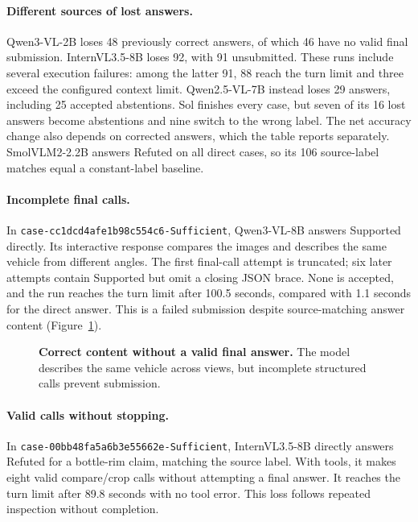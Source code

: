 

\paragraph{Different sources of lost answers.}
Qwen3-VL-2B loses 48 previously correct answers, of which 46 have no valid final submission.
InternVL3.5-8B loses 92, with 91 unsubmitted.
These runs include several execution failures: among the latter 91, 88 reach the turn limit and three exceed the configured context limit.
Qwen2.5-VL-7B instead loses 29 answers, including 25 accepted abstentions.
Sol finishes every case, but seven of its 16 lost answers become abstentions and nine switch to the wrong label.
The net accuracy change also depends on corrected answers, which the table reports separately.
SmolVLM2-2.2B answers Refuted on all direct cases, so its 106 source-label matches equal a constant-label baseline.

\paragraph{Incomplete final calls.}
In \texttt{case-cc1dcd4afe1b98c554c6-Sufficient}, Qwen3-VL-8B answers Supported directly.
Its interactive response compares the images and describes the same vehicle from different angles.
The first final-call attempt is truncated; six later attempts contain Supported but omit a closing JSON brace.
None is accepted, and the run reaches the turn limit after 100.5 seconds, compared with 1.1 seconds for the direct answer.
This is a failed submission despite source-matching answer content (Figure~\ref{fig:cases}).

\begin{figure}[t]\centering

\caption{\textbf{Correct content without a valid final answer.}
The model describes the same vehicle across views, but incomplete structured calls prevent submission.}
\label{fig:cases}
\end{figure}

\paragraph{Valid calls without stopping.}
In \texttt{case-00bb48fa5a6b3e55662e-Sufficient}, InternVL3.5-8B directly answers Refuted for a bottle-rim claim, matching the source label.
With tools, it makes eight valid compare/crop calls without attempting a final answer.
It reaches the turn limit after 89.8 seconds with no tool error.
This loss follows repeated inspection without completion.

